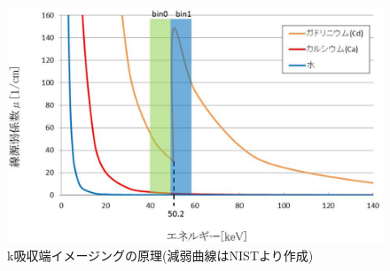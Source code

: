\begin{figure}[H]
 \begin{center}
 \includegraphics[width=12cm]{image/other/k-edge.eps}
 \end{center}
 \vspace{-0.7cm}
 \caption{k吸収端イメージングの原理(減弱曲線はNISTより作成)}
 \label{fig:k-edge}
\end{figure}









